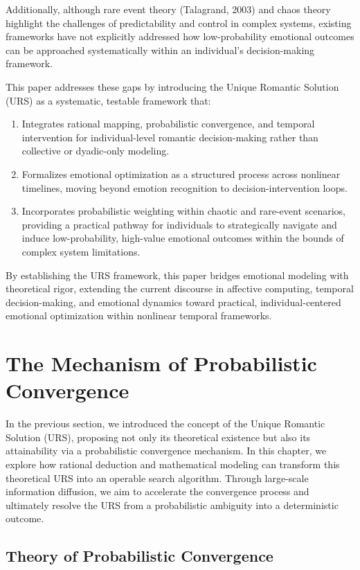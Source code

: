 \documentclass{article}
\begin{document}
Additionally, although rare event theory (Talagrand, 2003) and chaos theory highlight the challenges of predictability and control in complex systems, existing frameworks have not explicitly addressed how low-probability emotional outcomes can be approached systematically within an individual's decision-making framework.

This paper addresses these gaps by introducing the Unique Romantic Solution (URS) as a systematic, testable framework that:
\begin{enumerate}
\item Integrates rational mapping, probabilistic convergence, and temporal intervention for individual-level romantic decision-making rather than collective or dyadic-only modeling.
\item Formalizes emotional optimization as a structured process across nonlinear timelines, moving beyond emotion recognition to decision-intervention loops.
\item Incorporates probabilistic weighting within chaotic and rare-event scenarios, providing a practical pathway for individuals to strategically navigate and induce low-probability, high-value emotional outcomes within the bounds of complex system limitations.
\end{enumerate}

By establishing the URS framework, this paper bridges emotional modeling with theoretical rigor, extending the current discourse in affective computing, temporal decision-making, and emotional dynamics toward practical, individual-centered emotional optimization within nonlinear temporal frameworks.

\section{The Mechanism of Probabilistic Convergence}

In the previous section, we introduced the concept of the Unique Romantic Solution (URS), proposing not only its theoretical existence but also its attainability via a probabilistic convergence mechanism. In this chapter, we explore how rational deduction and mathematical modeling can transform this theoretical URS into an operable search algorithm. Through large-scale information diffusion, we aim to accelerate the convergence process and ultimately resolve the URS from a probabilistic ambiguity into a deterministic outcome.

\subsection{Theory of Probabilistic Convergence}
\end{document}
